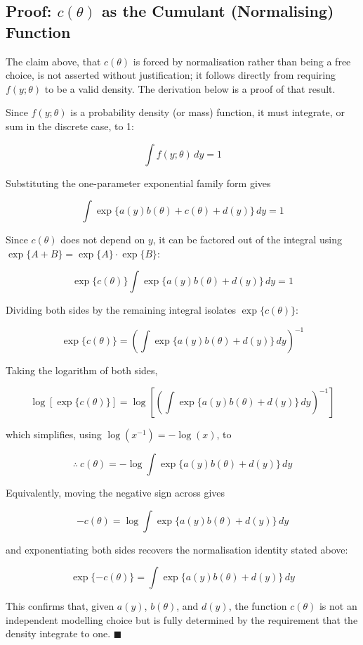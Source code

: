 \subsection*{Proof: $c(\theta)$ as the Cumulant (Normalising) Function}
The claim above, that $c(\theta)$ is forced by normalisation rather than being a free choice, is not asserted without justification; it follows directly from requiring $f(y;\theta)$ to be a valid density. The derivation below is a proof of that result.

Since $f(y;\theta)$ is a probability density (or mass) function, it must integrate, or sum in the discrete case, to 1:
\begin{mathbox}
\[
\int f(y;\theta)\,dy = 1
\]
\end{mathbox}
Substituting the one-parameter exponential family form gives
\begin{mathbox}
\[
\int \exp\{a(y)b(\theta)+c(\theta)+d(y)\}\,dy = 1
\]
\end{mathbox}
Since $c(\theta)$ does not depend on $y$, it can be factored out of the integral using $\exp\{A+B\}=\exp\{A\}\cdot\exp\{B\}$:
\begin{mathbox}
\[
\exp\{c(\theta)\}\int \exp\{a(y)b(\theta)+d(y)\}\,dy = 1
\]
\end{mathbox}
Dividing both sides by the remaining integral isolates $\exp\{c(\theta)\}$:
\begin{mathbox}
\[
\exp\{c(\theta)\} = \left(\int \exp\{a(y)b(\theta)+d(y)\}\,dy\right)^{-1}
\]
\end{mathbox}
Taking the logarithm of both sides,
\begin{mathbox}
\[
\log\left[\exp\{c(\theta)\}\right] = \log\left[\left(\int \exp\{a(y)b(\theta)+d(y)\}\,dy\right)^{-1}\right]
\]
\end{mathbox}
which simplifies, using $\log(x^{-1}) = -\log(x)$, to
\begin{mathbox}
\[
\therefore\ c(\theta) = -\log\int \exp\{a(y)b(\theta)+d(y)\}\,dy
\]
\end{mathbox}
Equivalently, moving the negative sign across gives
\begin{mathbox}
\[
-c(\theta) = \log\int \exp\{a(y)b(\theta)+d(y)\}\,dy
\]
\end{mathbox}
and exponentiating both sides recovers the normalisation identity stated above:
\begin{mathbox}
\[
\exp\{-c(\theta)\} = \int \exp\{a(y)b(\theta)+d(y)\}\,dy
\]
\end{mathbox}
This confirms that, given $a(y)$, $b(\theta)$, and $d(y)$, the function $c(\theta)$ is not an independent modelling choice but is fully determined by the requirement that the density integrate to one. $\blacksquare$

